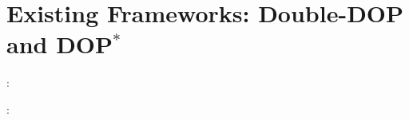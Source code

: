 
\section{Existing Frameworks: Double-DOP and DOP$^*$}

\ddop: \cite{sangati2011}

\dops: \cite{zollmann2005}